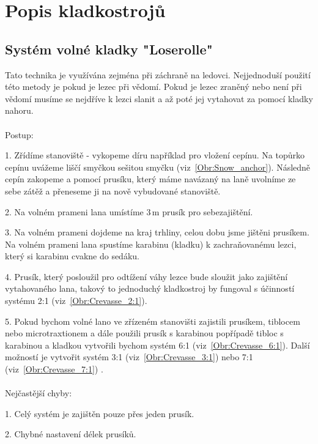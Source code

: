 \section{Popis kladkostrojů}
\subsection{Systém volné kladky "Loserolle"}

Tato technika je využívána zejména při záchraně na ledovci. Nejjednoduší použití této metody je pokud je lezec při vědomí. Pokud je lezec zraněný nebo není při vědomí musíme se nejdříve k lezci slanit a až poté jej vytahovat za pomocí kladky nahoru. 
\\
\\
Postup:

1. Zřídíme stanoviště - vykopeme díru například pro vložení cepínu. Na topůrko cepínu uvážeme liščí smyčkou sešitou smyčku (viz~\autoref{Obr:Snow_anchor}). Následně cepín zakopeme a pomocí prusíku, který máme navázaný na laně uvolníme ze sebe zátěž a přeneseme ji na nově vybudované stanoviště.

2. Na volném prameni lana umístíme 3\,m prusík pro sebezajištění.

3. Na volném prameni dojdeme na kraj trhliny, celou dobu jsme jištěni prusíkem. Na volném prameni lana spustíme karabinu (kladku) k zachraňovanému lezci, který si karabinu cvakne do sedáku.

4. Prusík, který posloužil pro odtížení váhy lezce bude sloužit jako zajištění vytahovaného lana, takový to jednoduchý kladkostroj by fungoval s účinností systému 2:1 (viz~\autoref{Obr:Crevasse_2:1}). 

5. Pokud bychom volné lano ve zřízeném stanovišti zajistili prusíkem, tiblocem nebo microtraxtionem a dále použili prusík s karabinou popřípadě tibloc s karabinou a kladkou vytvořili bychom systém 6:1 (viz~\autoref{Obr:Crevasse_6:1}). Další možností je vytvořit systém 3:1 (viz~\autoref{Obr:Crevasse_3:1}) nebo 7:1 (viz~\autoref{Obr:Crevasse_7:1}) \cite{climbing_school_2022}.
\\
\\
Nejčastější chyby:

1. Celý systém je zajištěn pouze přes jeden prusík.

2. Chybné nastavení délek prusíků.


